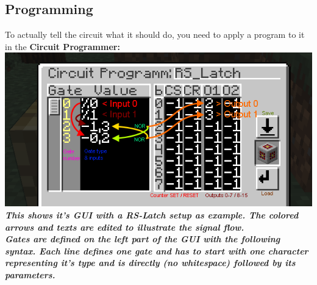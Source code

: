 \documentclass[11pt]{article} %
\begin{document}
\subsection{Programming}
To actually tell the circuit what it should do, you need to apply a program to it in the \bf Circuit Programmer\rm :\\
\includegraphics[width = \textwidth]{programmer_gui}\\
\it This shows it's GUI with a RS-Latch setup as example. The colored arrows and texts are edited to illustrate the signal flow. \rm\\
Gates are defined on the left part of the GUI with the following syntax. Each line defines one gate and has to start with one character representing it's type and is directly (no whitespace) followed by its parameters. 
\end{document}
